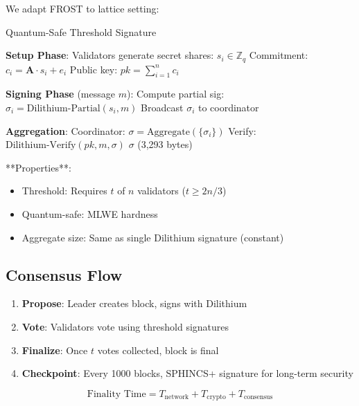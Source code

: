 \documentclass[11pt,letterpaper]{article}
\begin{document}
We adapt FROST \cite{komlo2020frost} to lattice setting:

\begin{algorithm}
\caption{Quantum-Safe Threshold Signature}
\begin{algorithmic}
\STATE \textbf{Setup Phase}:
\STATE Validators generate secret shares: $s_i \in \mathbb{Z}_q$
\STATE Commitment: $c_i = \mathbf{A} \cdot s_i + e_i$
\STATE Public key: $pk = \sum_{i=1}^n c_i$

\STATE \textbf{Signing Phase} (message $m$):
    \STATE Compute partial sig: $\sigma_i = \text{Dilithium-Partial}(s_i, m)$
    \STATE Broadcast $\sigma_i$ to coordinator
\ENDFOR

\STATE \textbf{Aggregation}:
\STATE Coordinator: $\sigma = \text{Aggregate}(\{\sigma_i\})$
\STATE Verify: $\text{Dilithium-Verify}(pk, m, \sigma)$
\RETURN $\sigma$ (3,293 bytes)
\end{algorithmic}
\end{algorithm}

**Properties**:
\begin{itemize}
    \item Threshold: Requires $t$ of $n$ validators ($t \geq 2n/3$)
    \item Quantum-safe: MLWE hardness
    \item Aggregate size: Same as single Dilithium signature (constant)
\end{itemize}

\subsection{Consensus Flow}

\begin{enumerate}
    \item \textbf{Propose}: Leader creates block, signs with Dilithium
    \item \textbf{Vote}: Validators vote using threshold signatures
    \item \textbf{Finalize}: Once $t$ votes collected, block is final
    \item \textbf{Checkpoint}: Every 1000 blocks, SPHINCS+ signature for long-term security
\end{enumerate}

\begin{equation}
\text{Finality Time} = T_{\text{network}} + T_{\text{crypto}} + T_{\text{consensus}}
\end{equation}
\end{document}
